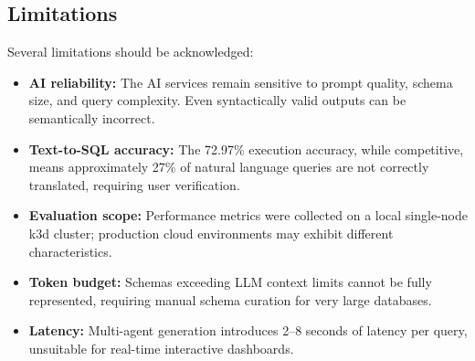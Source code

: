 \documentclass[twoside,twocolumn,10pt]{article}
\begin{document}
\subsection{Limitations}

Several limitations should be acknowledged:

\begin{itemize}
    \item \textbf{AI reliability:} The AI services remain sensitive to prompt quality, schema size, and query complexity. Even syntactically valid outputs can be semantically incorrect.
    \item \textbf{Text-to-SQL accuracy:} The 72.97\% execution accuracy, while competitive, means approximately 27\% of natural language queries are not correctly translated, requiring user verification.
    \item \textbf{Evaluation scope:} Performance metrics were collected on a local single-node k3d cluster; production cloud environments may exhibit different characteristics.
    \item \textbf{Token budget:} Schemas exceeding LLM context limits cannot be fully represented, requiring manual schema curation for very large databases.
    \item \textbf{Latency:} Multi-agent generation introduces 2--8 seconds of latency per query, unsuitable for real-time interactive dashboards.
\end{itemize}




\end{document}
